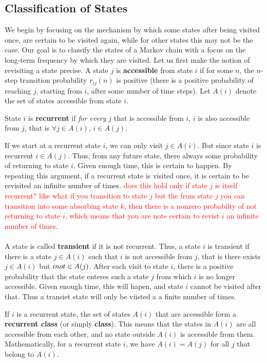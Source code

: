 \documentclass[11pt]{scrartcl}
\begin{document}
\subsection{Classification of States}
We begin by focusing on the mechanism by which some states after being visited
once, are certain to be visited again, while for other states this may not be
the case. Our goal is to classify the states of a Markov chain with a focus on
the long-term frequency by which they are visited. Let us first make the notion
of revisiting a state precise. A state $j$ is \textbf{accessible} from state $i$
if for some $n$, the $n$-step transition probability $r_{ij}(n)$ is positive
(there is a positive probability of reaching $j$, starting from $i$, after some
number of time steps). Let $A(i)$ denote the set of states accessible from
state $i$.
\begin{definition}[recurrent]
  State $i$ is \textbf{recurrent} if \emph{for every} $j$ that is accessible
from $i$, $i$ is also accessible from $j$, that is $\forall j \in A(i)$, $i\in
A(j)$. 
\end{definition}
If we start at a recurrent state $i$, we can only visit $j\in A(i)$. But since
state $i$ is recurrent $i\in A(j)$. Thus, from any future state, there always
some probability of returning to state $i$. Given enough time, this is certain
to happen. By repeating this argument, if a recurrent state is visited once, it
is certain to be revisited an infinite number of times. \textcolor{red}{does
this hold only if state $j$ is itself recurrent? like what if you transition to
state $j$ but the from state $j$ you can transition into some absorbing state
$k$, then there is a nonzero probabilty of not returning to state $i$, which
means that you are note certain to revist $i$ an infinite number of times}.\\\\
A state is called \textbf{transient} if it is not recurrent. Thus, a state
$i$ is transient if there is a state $j\in A(i)$ such that $i$ is not
accessible from $j$, that is there exists $j\in A(i)$ but $i\\not\in  A(j)$.
After each visit to state $i$, there is a positive probability that the state
enteres such a state $j$ from which $i$ is no longer accessible. Given enough
time, this will hapen, and state $i$ cannot be visited after that. Thus
a transiet state will only be viisted a a finite number of times. 
\begin{definition}
  If $i$ is a recurrent state, the set of states $A(i)$ that are accessible
  form a \textbf{recurrent class} (or simply \textbf{class}). This means that
  the states in $A(i)$ are all accessible from each other, and no state outside
  $A(i)$ is accessible from them. Mathematically, for a recurrent state $i$, we
  have $A(i) = A(j)$ for all $j$ that belong to $A(i)$. 
\end{definition}
\end{document}

